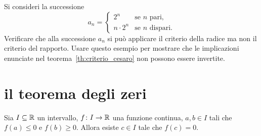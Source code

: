  \begin{exercise}
 Si consideri la successione
 \[
 a_n =
 \begin{cases}
    2^n &\text{se $n$ pari},\\
    n\cdot 2^n &\text{se $n$ dispari}.
 \end{cases}
 \]
 Verificare che alla successione $a_n$
  si può applicare il criterio della radice ma
  non il criterio del rapporto.
  Usare questo esempio per mostrare che le implicazioni
  enunciate nel teorema~\ref{th:criterio_cesaro} non
  possono essere invertite.
  \end{exercise}  

\section{il teorema degli zeri}

\begin{theorem}
\mymark{***}%
%
%
\label{th:zeri}%
Sia $I\subseteq {\mathbb R}$ un intervallo, $f\colon I \to {\mathbb R}$ una funzione
continua, $a,b\in I$ tali che $f(a)\le 0$ e $f(b)\ge 0$.
Allora esiste $c\in I$ tale che $f(c)=0$.
\end{theorem}

